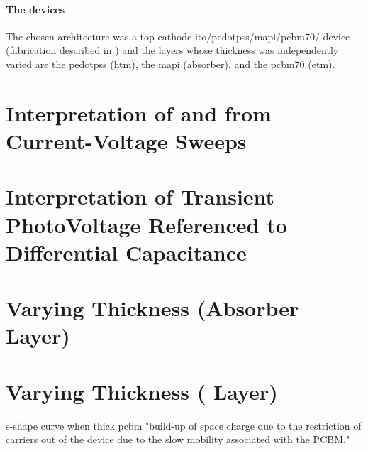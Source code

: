 	\paragraph{The devices} The chosen architecture was a top cathode \gls{ito}\-/\gls{pedotpss}\-/\gls{mapi}\-/\gls{pcbm70}\-/ device (fabrication described in ) and the layers whose thickness was independently varied are the \gls{pedotpss} (\gls{htm}), the \gls{mapi} (absorber), and the \gls{pcbm70} (\gls{etm}).

\section{Interpretation of  and  from Current-Voltage Sweeps}

\section{Interpretation of Transient PhotoVoltage Referenced to Differential Capacitance}\label{interpretation_tpvdc}

\section{Varying  Thickness (Absorber Layer)}


\section{Varying  Thickness ( Layer)}

s-shape curve when thick pcbm \cite{Wheeler2017} "build-up of space charge due to the restriction of carriers out of the device due to the slow mobility associated with the PCBM."


